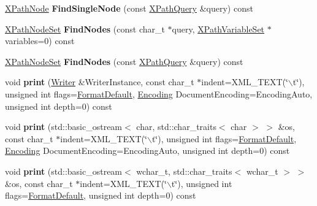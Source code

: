 \begin{DoxyCompactItemize}
\item 
\hypertarget{classphys_1_1xml_1_1Node_ae1a69821d5eb5997c25e3a6ec1ef8b74}{
\hyperlink{classphys_1_1xml_1_1XPathNode}{XPathNode} {\bfseries FindSingleNode} (const \hyperlink{classphys_1_1xml_1_1XPathQuery}{XPathQuery} \&query) const }
\label{d7/d0a/classphys_1_1xml_1_1Node_ae1a69821d5eb5997c25e3a6ec1ef8b74}

\item 
\hypertarget{classphys_1_1xml_1_1Node_a7390ba1c09b83544365abc7bf8ec5b8f}{
\hyperlink{classphys_1_1xml_1_1XPathNodeSet}{XPathNodeSet} {\bfseries FindNodes} (const char\_\-t $\ast$query, \hyperlink{classphys_1_1xml_1_1XPathVariableSet}{XPathVariableSet} $\ast$variables=0) const }
\label{d7/d0a/classphys_1_1xml_1_1Node_a7390ba1c09b83544365abc7bf8ec5b8f}

\item 
\hypertarget{classphys_1_1xml_1_1Node_a466766bf750da2a04acd8a32d2b8a458}{
\hyperlink{classphys_1_1xml_1_1XPathNodeSet}{XPathNodeSet} {\bfseries FindNodes} (const \hyperlink{classphys_1_1xml_1_1XPathQuery}{XPathQuery} \&query) const }
\label{d7/d0a/classphys_1_1xml_1_1Node_a466766bf750da2a04acd8a32d2b8a458}

\item 
\hypertarget{classphys_1_1xml_1_1Node_a526817671e39653b0dca70c2ba8daa55}{
void {\bfseries print} (\hyperlink{classphys_1_1xml_1_1Writer}{Writer} \&WriterInstance, const char\_\-t $\ast$indent=XML\_\-TEXT(\char`\"{}$\backslash$t\char`\"{}), unsigned int flags=\hyperlink{namespacephys_1_1xml_a08bf6aab51f79929d9097706a5e64408}{FormatDefault}, \hyperlink{namespacephys_1_1xml_a420f5de782438f88160321385bea2015}{Encoding} DocumentEncoding=EncodingAuto, unsigned int depth=0) const }
\label{d7/d0a/classphys_1_1xml_1_1Node_a526817671e39653b0dca70c2ba8daa55}

\item 
\hypertarget{classphys_1_1xml_1_1Node_a99158a08970f0497a3925dddf8227b87}{
void {\bfseries print} (std::basic\_\-ostream$<$ char, std::char\_\-traits$<$ char $>$ $>$ \&os, const char\_\-t $\ast$indent=XML\_\-TEXT(\char`\"{}$\backslash$t\char`\"{}), unsigned int flags=\hyperlink{namespacephys_1_1xml_a08bf6aab51f79929d9097706a5e64408}{FormatDefault}, \hyperlink{namespacephys_1_1xml_a420f5de782438f88160321385bea2015}{Encoding} DocumentEncoding=EncodingAuto, unsigned int depth=0) const }
\label{d7/d0a/classphys_1_1xml_1_1Node_a99158a08970f0497a3925dddf8227b87}

\item 
\hypertarget{classphys_1_1xml_1_1Node_a27b7869e5208547e06b6164bbc68ca0e}{
void {\bfseries print} (std::basic\_\-ostream$<$ wchar\_\-t, std::char\_\-traits$<$ wchar\_\-t $>$ $>$ \&os, const char\_\-t $\ast$indent=XML\_\-TEXT(\char`\"{}$\backslash$t\char`\"{}), unsigned int flags=\hyperlink{namespacephys_1_1xml_a08bf6aab51f79929d9097706a5e64408}{FormatDefault}, unsigned int depth=0) const }
\label{d7/d0a/classphys_1_1xml_1_1Node_a27b7869e5208547e06b6164bbc68ca0e}


\end{DoxyCompactItemize}
